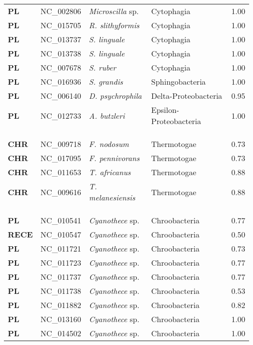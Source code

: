\begin{adjustwidth}{-3cm}{2cm}
{\begin{supertabular}{>{\bfseries}l|p{0.1\textwidth}p{0.14\textwidth}l|l}
PL & NC\_002806 & \textit{Microscilla} sp. & Cytophagia & 1.00\\
PL & NC\_015705 & \textit{R. slithyformis} & Cytophagia & 1.00\\
PL & NC\_013737 & \textit{S. linguale} & Cytophagia & 1.00\\
PL & NC\_013738 & \textit{S. linguale} & Cytophagia & 1.00\\
PL & NC\_007678 & \textit{S. ruber} & Cytophagia & 1.00\\
PL & NC\_016936 & \textit{S. grandis} & Sphingobacteria & 1.00\\
PL & NC\_006140 & \textit{D. psychrophila} & Delta-Proteobacteria & 0.95\\
PL & NC\_012733 & \textit{A. butzleri} & Epsilon-Proteobacteria & 1.00\\
\\
\\
\hline\\
CHR & NC\_009718 & \textit{F. nodosum} & Thermotogae & 0.73\\
CHR & NC\_017095 & \textit{F. pennivorans} & Thermotogae & 0.73\\
CHR & NC\_011653 & \textit{T. africanus} & Thermotogae & 0.88\\
CHR & NC\_009616 & \textit{T. melanesiensis} & Thermotogae & 0.88\\
\\
\\
\hline\\
PL & NC\_010541 & \textit{Cyanothece} sp. & Chroobacteria & 0.77\\
RECE & NC\_010547 & \textit{Cyanothece} sp. & Chroobacteria & 0.50\\
PL & NC\_011721 & \textit{Cyanothece} sp. & Chroobacteria & 0.73\\
PL & NC\_011723 & \textit{Cyanothece} sp. & Chroobacteria & 0.77\\
PL & NC\_011737 & \textit{Cyanothece} sp. & Chroobacteria & 0.77\\
PL & NC\_011738 & \textit{Cyanothece} sp. & Chroobacteria & 0.53\\
PL & NC\_011882 & \textit{Cyanothece} sp. & Chroobacteria & 0.82\\
PL & NC\_013160 & \textit{Cyanothece} sp. & Chroobacteria & 1.00\\
PL & NC\_014502 & \textit{Cyanothece} sp. & Chroobacteria & 1.00\\

\end{supertabular}}
\end{adjustwidth}
